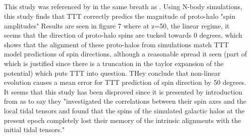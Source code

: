 \documentclass[fleqn,usenatbib]{mnras}
\begin{document}
\subsection{\citet{Porciani_02}}
This study was referenced by \citet{Trowland_13} in the same breath as \citet{Lee_pen_00}.
Using N-body simulations, this study finds that TTT correctly predics the magnitude of proto-halo "spin amplitudes"
Results are seen in figure 7 where at z=50, the linear regime, it seems that the direction of proto-halo spins are tucked towards 0 degrees, which shows that the alignment of these proto-halos from simulations match TTT model predictions of spin directions, although a reasonable spread it seen (part of which is justified since there is a truncation in the taylor expansion of the potential) which puts TTT into question.
THey conclude that non-linear evolution causes a mean error for TTT prediction of spin direction by 50 degrees. It seems that this study has been disproved since it is presented by introduction from \citet{Lee_Erdogdu_07} as to say they "investigated the correlations between their spin axes and the local tidal tensors and found that the spins of the simulated galactic halos at the present epoch completely lost their memory of the intrinsic alignments with the initial tidal tensors."
\end{document}
